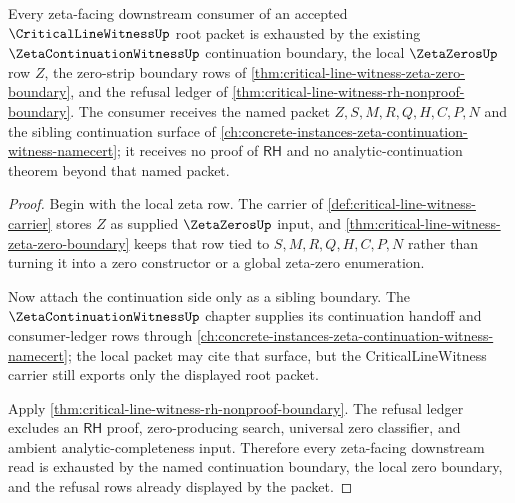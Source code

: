 \begin{theorem}
\label{thm:critical-line-witness-root-zeta-ledger-nonescape}
Every zeta-facing downstream consumer of an accepted $\CriticalLineWitnessUp$ root packet is exhausted by the existing $\ZetaContinuationWitnessUp$ continuation boundary, the local $\ZetaZerosUp$ row $Z$, the zero-strip boundary rows of \autoref{thm:critical-line-witness-zeta-zero-boundary}, and the refusal ledger of \autoref{thm:critical-line-witness-rh-nonproof-boundary}. The consumer receives the named packet $Z,S,M,R,Q,H,C,P,N$ and the sibling continuation surface of \autoref{ch:concrete-instances-zeta-continuation-witness-namecert}; it receives no proof of $\mathsf{RH}$ and no analytic-continuation theorem beyond that named packet.
\end{theorem}
\begin{proof}
Begin with the local zeta row. The carrier of \autoref{def:critical-line-witness-carrier} stores $Z$ as supplied $\ZetaZerosUp$ input, and \autoref{thm:critical-line-witness-zeta-zero-boundary} keeps that row tied to $S,M,R,Q,H,C,P,N$ rather than turning it into a zero constructor or a global zeta-zero enumeration.

Now attach the continuation side only as a sibling boundary. The $\ZetaContinuationWitnessUp$ chapter supplies its continuation handoff and consumer-ledger rows through \autoref{ch:concrete-instances-zeta-continuation-witness-namecert}; the local packet may cite that surface, but the CriticalLineWitness carrier still exports only the displayed root packet.

Apply \autoref{thm:critical-line-witness-rh-nonproof-boundary}. The refusal ledger excludes an $\mathsf{RH}$ proof, zero-producing search, universal zero classifier, and ambient analytic-completeness input. Therefore every zeta-facing downstream read is exhausted by the named continuation boundary, the local zero boundary, and the refusal rows already displayed by the packet.
\end{proof}

